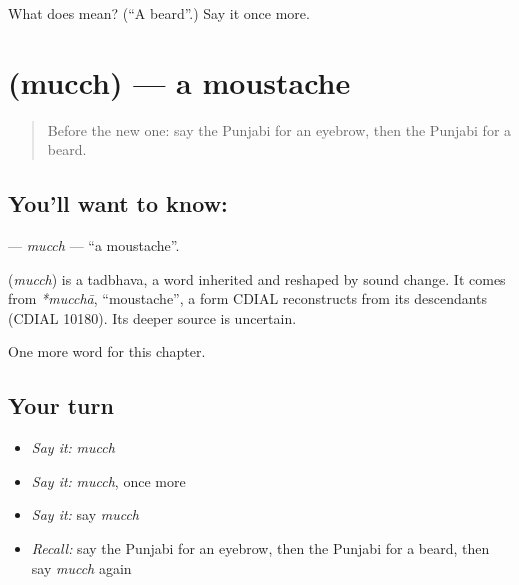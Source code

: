 \begin{tcolorbox}[breakable,colback=teal!4,colframe=teal!35!black,title={Before you move on}]
What does  mean? (\textquotedblleft{}A beard\textquotedblright{}.) Say it once more.
\end{tcolorbox}
\section[\texorpdfstring{\pa{ਮੁੱਛ} (mucch)}{ਮੁੱਛ (mucch)}]{ (mucch) — a moustache}

\label{lesson:PA-C134-mucch}



\begin{quote}
Before the new one: say the Punjabi for an eyebrow, then the Punjabi for a beard.
\end{quote}

\subsection*{You'll want to know: }
\textbf{} — \emph{mucch} — \textquotedblleft{}a moustache\textquotedblright{}.

\begin{cousinweb}
\textbf{} (\emph{mucch}) is a tadbhava, a word inherited and reshaped by sound change. It comes from \emph{*mucchā}, \textquotedblleft{}moustache\textquotedblright{}, a form CDIAL reconstructs from its descendants (CDIAL 10180). Its deeper source is uncertain.
\end{cousinweb}

\begin{grammarlens}[title={What you've built}]
One more word for this chapter.
\end{grammarlens}

\subsection*{Your turn}
\begin{itemize}
\raggedright
  \item \emph{Say it:} \emph{mucch}
  \item \emph{Say it:} \emph{mucch}, once more
  \item \emph{Say it:} say \emph{mucch}
  \item \emph{Recall:} say the Punjabi for an eyebrow, then the Punjabi for a beard, then say \emph{mucch} again
\end{itemize}

